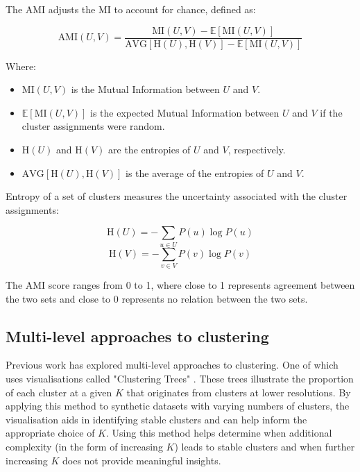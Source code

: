 \documentclass{article}
\begin{document}
The AMI adjusts the MI to account for chance, defined as:

\begin{equation}
\label{eq:AMI}
\text{AMI}(U, V) = \frac{\text{MI}(U, V) - \mathbb{E}[\text{MI}(U, V)]}{\text{AVG}[\text{H}(U), \text{H}(V)] - \mathbb{E}[\text{MI}(U, V)]}
\end{equation}

Where:
\begin{itemize}
    \item \( \text{MI}(U, V) \) is the Mutual Information between \( U \) and \( V \).
    \item \( \mathbb{E}[\text{MI}(U, V)] \) is the expected Mutual Information between \( U \) and \( V \) if the cluster assignments were random.
    \item \( \text{H}(U) \) and \( \text{H}(V) \) are the entropies of \( U \) and \( V \), respectively.
    \item \( \text{AVG}[\text{H}(U), \text{H}(V)] \) is the average of the entropies of \( U \) and \( V \).
\end{itemize}

Entropy of a set of clusters measures the uncertainty associated with the cluster assignments:

\[
\text{H}(U) = -\sum_{u \in U} P(u) \log P(u)
\]
\[
\text{H}(V) = -\sum_{v \in V} P(v) \log P(v)
\]



The AMI score ranges from 0 to 1, where close to 1 represents agreement between the two sets and close to 0 represents no relation between the two sets.


\subsection*{Multi-level approaches to clustering}
Previous work has explored multi-level approaches to clustering. One of which uses visualisations called "Clustering Trees" \cite{zappiaClusteringTreesVisualization2018c}. These trees illustrate the proportion of each cluster at a given $K$ that originates from clusters at lower resolutions. By applying this method to synthetic datasets with varying numbers of clusters, the visualisation aids in identifying stable clusters and can help inform the appropriate choice of $K$. Using this method helps determine when additional complexity (in the form of increasing $K$) leads to stable clusters and when further increasing $K$ does not provide meaningful insights.
\end{document}
